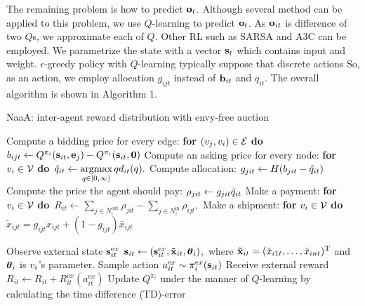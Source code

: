 The remaining problem is how to predict $\mathrm{\mathbf{o}}_t$.
Although several method can be applied to this problem,
we use $Q$-learning to predict $\mathrm{\mathbf{o}}_t$.
As $\mathrm{\mathbf{o}}_{it}$ is difference of two $Q$s, we approximate each of $Q$.
Other RL such as SARSA and A3C can be employed.
We parametrize the state with a vector $\mathrm{\mathbf{s}}_t$ 
which contains input and weight.
$\epsilon$-greedy policy with $Q$-learning typically suppose that discrete actions
So, as an action, we employ allocation $g_{ijt}$ instead of $\mathrm{\mathbf{b}}_{it}$ and $q_{it}$.
The overall algorithm is shown in Algorithm 1.

\begin{algorithm}[t]
\caption{NaaA: inter-agent reward distribution with envy-free auction}
\begin{algorithmic}[1]
		\STATE Compute a bidding price for every edge: \textbf{for} $(v_j, v_i) \in \mathcal{E}$ \textbf{do}\
		$b_{ijt} \leftarrow Q^{\pi_i}( \mathrm{\mathbf{s}}_{it}, \mathrm{\mathbf{e}}_j) - Q^{\pi_i}( \mathrm{\mathbf{s}}_{it}, \mathrm{\mathbf{0}})$ 
		\STATE Compute an asking price for every node: \textbf{for} $\unit \in \units$ \textbf{do}\
		${\hat{q}}_{it} \leftarrow \mathop{\rm argmax}\limits_{q \in [0, \infty)} q d_{it}(q).$
		\FOR{$(v_i, v_j) \in \edges$}
				\STATE Compute allocation: $g_{jit} \leftarrow H(b_{jit} - {\hat{q}}_{it})$ 
				\STATE Compute the price the agent should pay: $\rho_{jit} \leftarrow g_{jit} {\hat{q}}_{it}$ 
		\ENDFOR
		\STATE Make a payment: \textbf{for} $\unit \in \units$ \textbf{do}\
		$R_{it} \leftarrow \sum_{j \in N^\mathrm{out}_i} \rho_{jit} 
				- \sum_{j \in N^\mathrm{in}_i} \rho_{ijt},$
		\STATE Make a shipment: \textbf{for} $\unit \in \units$ \textbf{do}\
		$\tilde{x}_{ijt} = g_{ijt} x_{ijt} + ( 1 - g_{ijt} ) \bar{x}_{ijt} $

		\FOR{$\unit \in \units$} 
			\STATE Observe external state $\mathrm{\mathbf{s}}_{it}^{\mathrm ex}$
			\STATE $\mathrm{\mathbf{s}}_{it} \leftarrow (\mathrm{\mathbf{s}}_{it}^{\mathrm ex}, \mathrm{\mathbf{\tilde{x}}}_{it}, \boldsymbol{\theta}_i)$,\
				where $\mathrm{\mathbf{\tilde{x}}}_{it} = (\tilde{x}_{i1t}, \dots, \tilde{x}_{int})^\mathrm{T}$ and\
				$\boldsymbol{\theta}_i$ is $v_{i}$'s parameter.
			\STATE Sample action $a_{it}^{\mathrm ex} \sim \pi_i^{\mathrm ex}(\mathrm{\mathbf{s}}_{it})$
			\STATE Receive external reward $R_{it} \leftarrow R_{it} + R_{it}^{\mathrm ex}(a_{it}^{\mathrm ex})$
			\STATE Update $Q^{\pi_i}$ under the manner of $Q$-learning by calculating the time difference (TD)-error 
		\ENDFOR
	\ENDFOR
\end{algorithmic}
\end{algorithm}


